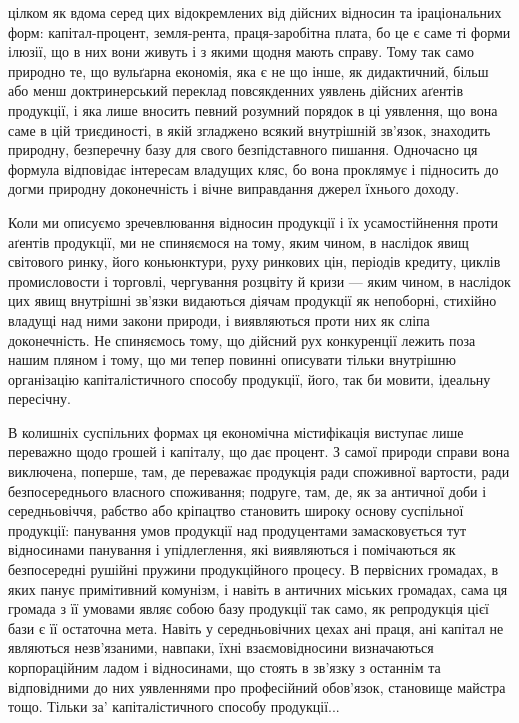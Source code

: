 \parcont{}  %
цілком як вдома серед цих відокремлених від дійсних відносин та іраціональних
форм: капітал-процент, земля-рента, праця-заробітна плата, бо це є саме ті
форми ілюзії, що в них вони живуть і з якими щодня мають справу. Тому
так само природно те, що вульґарна економія, яка є не що інше, як дидактичний,
більш або менш доктринерський переклад повсякденних уявлень дійсних аґентів
продукції, і яка лише вносить певний розумний порядок в ці уявлення, що вона
саме в цій триєдиності, в якій згладжено всякий внутрішній зв’язок, знаходить
природну, безперечну базу для свого безпідставного пишання. Одночасно ця
формула відповідає інтересам владущих кляс, бо вона проклямує і підносить
до догми природну доконечність і вічне виправдання джерел їхнього доходу.

Коли ми описуємо зречевлювання відносин продукції і їх усамостійнення
проти аґентів продукції, ми не спиняємося на тому, яким чином, в наслідок
явищ світового ринку, його коньюнктури, руху ринкових цін, періодів кредиту,
циклів промисловости і торговлі, чергування розцвіту й кризи — яким чином,
в наслідок цих явищ внутрішні зв’язки видаються діячам продукції як непоборні,
стихійно владущі над ними закони природи, і виявляються проти них як сліпа
доконечність. Не спиняємось тому, що дійсний рух конкуренції лежить поза
нашим пляном і тому, що ми тепер повинні описувати тільки внутрішню
організацію капіталістичного способу продукції, його, так би мовити, ідеальну
пересічну.

В колишніх суспільних формах ця економічна містифікація виступає лише
переважно щодо грошей і капіталу, що дає процент. З самої природи справи
вона виключена, поперше, там, де переважає продукція ради споживної вартости,
ради безпосереднього власного споживання; подруге, там, де, як за античної доби
і середньовіччя, рабство або кріпацтво становить широку основу суспільної продукції:
панування умов продукції над продуцентами замасковується тут відносинами
панування і упідлеглення, які виявляються і помічаються як безпосередні
рушійні пружини продукційного процесу. В первісних громадах, в яких
панує примітивний комунізм, і навіть в античних міських громадах, сама ця
громада з її умовами являє собою базу продукції так само, як репродукція цієї
бази є її остаточна мета. Навіть у середньовічних цехах ані праця, ані капітал
не являються незв’язаними, навпаки, їхні взаємовідносини визначаються корпораційним
ладом і відносинами, що стоять в зв’язку з останнім та відповідними
до них уявленнями про професійний обов’язок, становище майстра тощо.
Тільки за' капіталістичного способу продукції...

